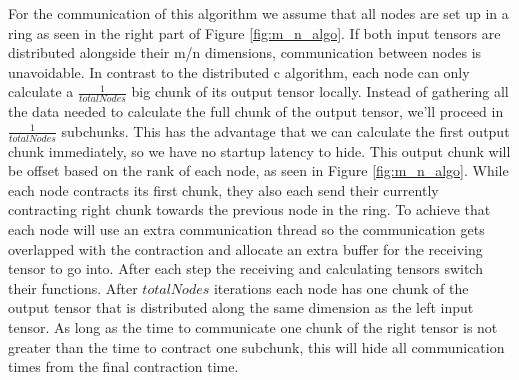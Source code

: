 For the communication of this algorithm we assume that all nodes are set up in a ring as seen in the right part of Figure \ref{fig:m_n_algo}.
If both input tensors are distributed alongside their m/n dimensions, communication between nodes is unavoidable.
In contrast to the distributed c algorithm, each node can only calculate a $\frac{1}{totalNodes}$ big chunk of  its output tensor locally.
Instead of gathering all the data needed to calculate the full chunk of the output tensor, we'll proceed in $\frac{1}{totalNodes}$ subchunks.
This has the advantage that we can calculate the first output chunk immediately, so we have no startup latency to hide.
This output chunk will be offset based on the rank of each node, as seen in Figure \ref{fig:m_n_algo}.
While each node contracts its first chunk, they also each send their currently contracting right chunk towards the previous node in the ring.
To achieve that each node will use an extra communication thread so the communication gets overlapped with the contraction and allocate an extra buffer for the receiving tensor to go into.
After each step the receiving and calculating tensors switch their functions.
After $totalNodes$ iterations each node has one chunk of the output tensor that is distributed along the same dimension as the left input tensor.
As long as the time to communicate one chunk of the right tensor is not greater than the time to contract one subchunk, this will hide all communication times from the final contraction time.

